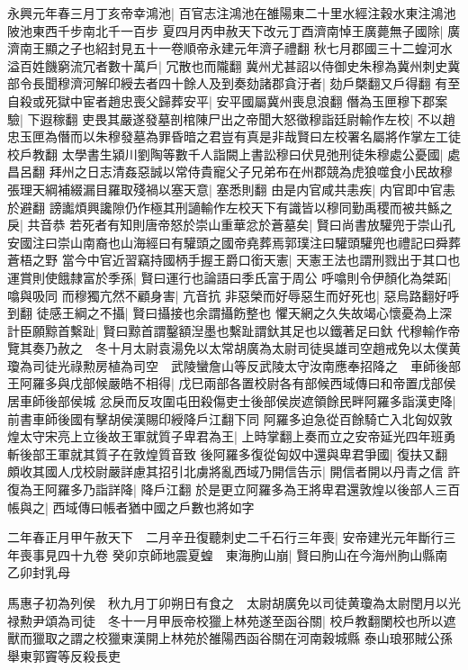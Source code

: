 永興元年春三月丁亥帝幸鴻池|{
	百官志注鴻池在雒陽東二十里水經注穀水東注鴻池陂池東西千步南北千一百步}
夏四月丙申赦天下改元丁酉濟南悼王廣薨無子國除|{
	廣濟南王顯之子也紹封見五十一卷順帝永建元年濟子禮翻}
秋七月郡國三十二蝗河水溢百姓饑窮流冗者數十萬戶|{
	冗散也而隴翻}
冀州尤甚詔以侍御史朱穆為冀州刺史冀部令長聞穆濟河解印綬去者四十餘人及到奏劾諸郡貪汙者|{
	劾戶槩翻又戶得翻}
有至自殺或死獄中宦者趙忠喪父歸葬安平|{
	安平國屬冀州喪息浪翻}
僭為玉匣穆下郡案驗|{
	下遐稼翻}
吏畏其嚴遂發墓剖棺陳尸出之帝聞大怒徵穆詣廷尉輸作左校|{
	不以趙忠玉匣為僭而以朱穆發墓為罪昏暗之君豈有真是非哉賢曰左校署名屬將作掌左工徒校戶教翻}
太學書生潁川劉陶等數千人詣闕上書訟穆曰伏見弛刑徒朱穆處公憂國|{
	處昌呂翻}
拜州之日志清姦惡誠以常侍貴寵父子兄弟布在州郡競為虎狼噬食小民故穆張理天綱補綴漏目羅取殘禍以塞天意|{
	塞悉則翻}
由是内官咸共恚疾|{
	内官即中官恚於避翻}
謗讟煩興讒隙仍作極其刑讁輸作左校天下有識皆以穆同勤禹稷而被共鯀之戾|{
	共音恭}
若死者有知則唐帝怒於崇山重華忿於蒼墓矣|{
	賢曰尚書放驩兜于崇山孔安國注曰崇山南裔也山海經曰有驩頭之國帝堯葬焉郭璞注曰驩頭驩兜也禮記曰舜葬蒼梧之野}
當今中官近習竊持國柄手握王爵口銜天憲|{
	天憲王法也謂刑戮出于其口也}
運賞則使餓隸富於季孫|{
	賢曰運行也論語曰季氏富于周公}
呼噏則令伊顏化為桀跖|{
	噏與吸同}
而穆獨亢然不顧身害|{
	亢音抗}
非惡榮而好辱惡生而好死也|{
	惡烏路翻好呼到翻}
徒感王綱之不攝|{
	賢曰攝接也余謂攝飭整也}
懼天網之久失故竭心懷憂為上深計臣願黥首繫趾|{
	賢曰黥首謂鑿額湼墨也繫趾謂釱其足也以鐵著足曰釱}
代穆輸作帝覽其奏乃赦之　冬十月太尉袁湯免以太常胡廣為太尉司徒吳雄司空趙戒免以太僕黄瓊為司徒光祿勲房植為司空　武陵蠻詹山等反武陵太守汝南應奉招降之　車師後部王阿羅多與戊部候嚴皓不相得|{
	戊巳兩部各置校尉各有部候西域傳曰和帝置戊部侯居車師後部侯城}
忿戾而反攻圍屯田殺傷吏士後部侯炭遮領餘民畔阿羅多詣漢吏降|{
	前書車師後國有擊胡侯漢賜印綬降戶江翻下同}
阿羅多迫急從百餘騎亡入北匈奴敦煌太守宋亮上立後故王軍就質子卑君為王|{
	上時掌翻上奏而立之安帝延光四年班勇斬後部王軍就其質子在敦煌質音致}
後阿羅多復從匈奴中還與卑君爭國|{
	復扶又翻}
頗收其國人戊校尉嚴詳慮其招引北虜將亂西域乃開信告示|{
	開信者開以丹青之信}
許復為王阿羅多乃詣詳降|{
	降戶江翻}
於是更立阿羅多為王將卑君還敦煌以後部人三百帳與之|{
	西域傳曰帳者猶中國之戶數也將如字}


二年春正月甲午赦天下　二月辛丑復聽刺史二千石行三年喪|{
	安帝建光元年斷行三年喪事見四十九卷}
癸卯京師地震夏蝗　東海朐山崩|{
	賢曰朐山在今海州朐山縣南}
乙卯封乳母

馬惠子初為列侯　秋九月丁卯朔日有食之　太尉胡廣免以司徒黄瓊為太尉閏月以光禄勲尹頌為司徒　冬十一月甲辰帝校獵上林苑遂至函谷關|{
	校戶教翻闌校也所以遮獸而獵取之謂之校獵東漢開上林苑於雒陽西函谷關在河南穀城縣}
泰山琅邪賊公孫舉東郭竇等反殺長吏

